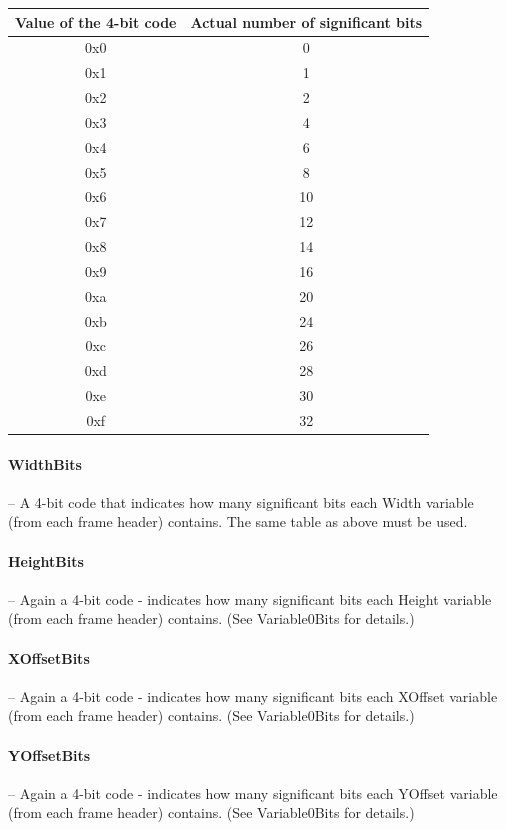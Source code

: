 \vspace{0.25cm}
\begin{tabular}{|c|c|}
Value of the 4-bit code & Actual number of significant bits \\
\hline
0x0 & 0 \\
0x1 & 1 \\
0x2 & 2 \\
0x3 & 4 \\
0x4 & 6 \\
0x5 & 8 \\
0x6 & 10 \\
0x7 & 12 \\
0x8 & 14 \\
0x9 & 16 \\
0xa & 20 \\
0xb & 24 \\
0xc & 26 \\
0xd & 28 \\
0xe & 30 \\
0xf & 32 \\
\end{tabular}




\paragraph{WidthBits} -- A 4-bit code that indicates how many significant bits 
each Width variable (from each frame header) contains. The same table as above 
must be used.	

\paragraph{HeightBits} -- Again a 4-bit code - indicates how many significant 
bits each Height variable (from each frame header) contains. (See Variable0Bits 
for details.)	

\paragraph{XOffsetBits} -- Again a 4-bit code - indicates how many significant 
bits each XOffset variable (from each frame header) contains. (See Variable0Bits 
for details.)	

\paragraph{YOffsetBits} -- Again a 4-bit code - indicates how many significant 
bits each YOffset variable (from each frame header) contains. (See Variable0Bits 
for details.)	

